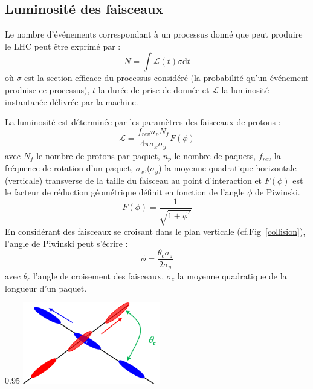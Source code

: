 \subsection{Luminosité des faisceaux}
Le nombre d'événements correspondant à un processus donné que peut produire le LHC peut être exprimé par :
\begin{equation}
N=\int \mathcal{L}(t)\sigma \mathrm dt
\end{equation}
où $\sigma$ est la section efficace du processus considéré (la probabilité qu'un événement produise ce processus), $t$ la durée de prise de donnée et $\mathcal{L}$ la luminosité instantanée délivrée par la machine.

La luminosité est déterminée par les paramètres des faisceaux de protons :
\begin{equation}
\mathcal{L}=\frac{f_{rev}n_{p}N_{f}}{4\pi \sigma_{x} \sigma_{y}} F(\phi)
\end{equation}
avec $N_{f}$ le nombre de protons par paquet, $n_{p}$ le nombre de paquets, $f_{rev}$ la fréquence de rotation d'un paquet, $\sigma_{x}$,($\sigma_{y}$) la moyenne quadratique horizontale (verticale) transverse de la taille du faisceau au point d'interaction et $F(\phi)$ est le facteur de réduction géométrique définit en fonction de l'angle $\phi$ de Piwinski.
\begin{equation}
F(\phi)=\frac{1}{\sqrt{1+\phi^{2}}}
\end{equation}
En considérant des faisceaux se croisant dans le plan verticale (cf.Fig~\ref{collision}), l'angle de Piwinski peut s'écrire :
\begin{equation}
\phi=\frac{\theta_{c}\sigma_{z}}{2\sigma_{y}}
\end{equation}
avec $\theta_{c}$ l'angle de croisement des faisceaux, $\sigma_{z}$ la moyenne quadratique de la longueur d'un paquet.


\begin{minipagewithmarginpars}[ht!]{0.95\textwidth}
\centering
\includegraphics[width=0.45\textwidth]{LHC/collision.png}
\label{collision}	
\end{minipagewithmarginpars}

